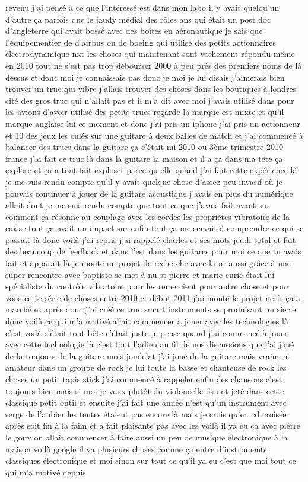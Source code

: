 revenu j'ai pensé à ce que l'intéressé est dans mon labo il y avait quelqu'un d'autre ça parfois que le jaudy médial des rôles ans qui était un post doc d'angleterre qui avait bossé avec des boîtes en aéronautique je sais que l'équipementier de d'airbus ou de boeing qui utilisé des petits actionnaires électrodynamique nxt les choses qui maintenant sont vachement répondu même en 2010 tout ne s'est pas trop débourser 2000 à peu près des premiers noms de là dessus et donc moi je connaissais pas donc je moi je lui disais j'aimerais bien trouver un truc qui vibre j'allais trouver des choses dans les boutiques à londres cité des gros truc qui n'allait pas et il m'a dit avec moi j'avais utilisé dans pour les avions d'avoir utilisé des petits trucs regarde la marque est mixte et qu'il marque anglaise lui ce moment et donc j'ai pris un iphone j'ai pris un actionneur et 10 des jeux les culés sur une guitare à deux balles de match et j'ai commencé à balancer des trucs dans la guitare ça c'était mi 2010 ou 3ème trimestre 2010 france j'ai fait ce truc là dans la guitare la maison et il a ça dans ma tête ça explose et ça a tout fait exploser parce qu elle quand j'ai fait cette expérience là je me suis rendu compte qu'il y avait quelque chose d'assez peu invasif où je pouvais continuer à jouer de la guitare acoustique j'avais en plus du numérique allait dont je me suis rendu compte que tout ce que j'avais fait avant sur comment ça résonne au couplage avec les cordes les propriétés vibratoire de la caisse tout ça avait un impact sur enfin tout ça me servait à comprendre ce qui se passait là donc voilà j'ai repris j'ai rappelé charles et ses mots jeudi total et fait des beaucoup de feedback et dans l'est dans les guitares pour moi ce que tu avais fait et apparaît là je monte un projet de recherche avec la nr aussi grâce à une super rencontre avec baptiste se met à nu st pierre et marie curie était lui spécialiste du contrôle vibratoire pour les remercient pour autre chose et pour vous cette série de choses entre 2010 et début 2011 j'ai monté le projet nerfs ça a marché et après donc j'ai créé ce truc smart instruments se produisant un siècle donc voilà ce qui m'a motivé allait commencer à jouer avec les technologies là c'est voilà c'était tout bête c'était juste je pense quand j'ai commencé à jouer avec cette technologie là c'est tout l'adieu au fil de nos discussions que j'ai joué de la toujours de la guitare mois joudelat j'ai joué de la guitare mais vraiment amateur dans un groupe de rock je lui toute la basse et chanteuse de rock les choses un petit tapis stick j'ai commencé à rappeler enfin des chansons c'est toujours bien mais si moi je veux plutôt du violoncelle ils ont jeté dans cette classique petit outil et ensuite j'ai fait une année n'est qu'un instrument avec serge de l'aubier les tentes étaient pas encore là mais je crois qu'en cd croisée après soit fin à la faim et à fait plaisante pas avec les voilà il ya eu ça avec pierre le goux on allait commencer à faire aussi un peu de musique électronique à la maison voilà google il ya plusieurs choses comme ça entre d'instruments classiques électronique et moi sinon sur tout ce qu'il ya eu c'est que moi tout ce qui m'a motivé depuis 
